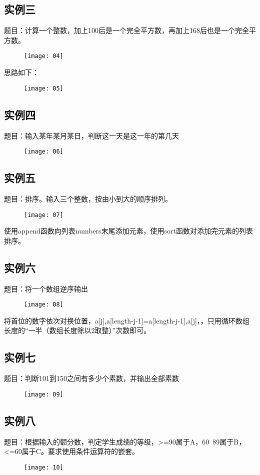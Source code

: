 \documentclass[12pt,letterpaper]{article}
\begin{document}
\subsection{实例三}
题目：计算一个整数，加上100后是一个完全平方数，再加上168后也是一个完全平方数。
\begin{figure}[H]
\centering
\texttt{[image: 04]}
\end{figure}
思路如下：
\begin{figure}[H]
\centering
\texttt{[image: 05]}
\end{figure}

\subsection{实例四}
题目：输入某年某月某日，判断这一天是这一年的第几天
\begin{figure}[H]
\centering
\texttt{[image: 06]}
\end{figure}

\subsection{实例五}
题目：排序。输入三个整数，按由小到大的顺序排列。
\begin{figure}[H]
\centering
\texttt{[image: 07]}
\end{figure}
使用append函数向列表numbers末尾添加元素，使用sort函数对添加完元素的列表排序。

\subsection{实例六}
题目：将一个数组逆序输出
\begin{figure}[H]
\centering
\texttt{[image: 08]}
\end{figure}
将首位的数字依次对换位置，a[j],a[length-j-1]=a[length-j-1],a[j]，，只用循环数组长度的“一半（数组长度除以2取整）”次数即可。

\subsection{实例七}
题目：判断101到150之间有多少个素数，并输出全部素数
\begin{figure}[H]
\centering
\texttt{[image: 09]}
\end{figure}

\subsection{实例八}
题目：根据输入的额分数，判定学生成绩的等级，>=90属于A，60~89属于B，<=60属于C。要求使用条件运算符的嵌套。
\begin{figure}[H]
\centering
\texttt{[image: 10]}
\end{figure}
\end{document}
